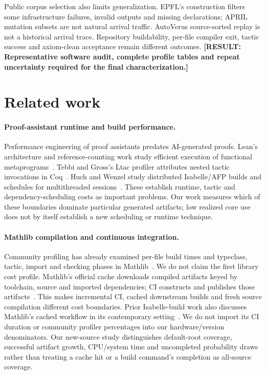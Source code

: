 \documentclass[10pt,twocolumn]{article}
\newcommand{\missing}[1]{\textbf{[RESULT: #1]}}
\begin{document}
Public corpus selection also limits generalization. EPFL's construction
filters some infrastructure failures, invalid outputs and missing
declarations; APRIL mutation subsets are not natural arrival traffic.
AutoVerus source-sorted replay is not a historical arrival trace.
Repository buildability, per-file compiler exit, tactic success and
axiom-clean acceptance remain different outcomes.
\missing{Representative software audit, complete profile tables and
repeat uncertainty required for the final characterization.}

\section{Related work}
\paragraph{Proof-assistant runtime and build performance.}
Performance engineering of proof assistants predates AI-generated proofs.
Lean's architecture and reference-counting work study efficient execution
of functional metaprograms~\cite{lean4,countingBeans}.
Tebbi and Gross's Ltac profiler attributes nested tactic invocations in
Coq~\cite{ltacProfiler2015}. Huch and Wenzel study distributed Isabelle/AFP
builds and schedules for multithreaded sessions~\cite{isabelleBuild2024}.
These establish runtime, tactic and dependency-scheduling costs as important
problems. Our work measures which of these boundaries dominate particular
generated artifacts; low realized core use does not by itself establish a
new scheduling or runtime technique.

\paragraph{Mathlib compilation and continuous integration.}
Community profiling has already examined per-file build times and
typeclass, tactic, import and checking phases in Mathlib~\cite{stollMathlib2024}.
We do not claim the first library cost profile.
Mathlib's official cache downloads compiled artifacts keyed by toolchain,
source and imported dependencies; CI constructs and publishes those
artifacts~\cite{mathlibCache2026}.
This makes incremental CI, cached downstream builds and fresh source
compilation different cost boundaries.
Prior Isabelle-build work also discusses Mathlib's cached workflow in its
contemporary setting~\cite{isabelleBuild2024}.
We do not import its CI duration or community profiler percentages into our
hardware/version denominators.
Our new-source study distinguishes default-root coverage, successful artifact
growth, CPU/system time and uncompleted probability draws rather than
treating a cache hit or a build command's completion as all-source coverage.
\end{document}
